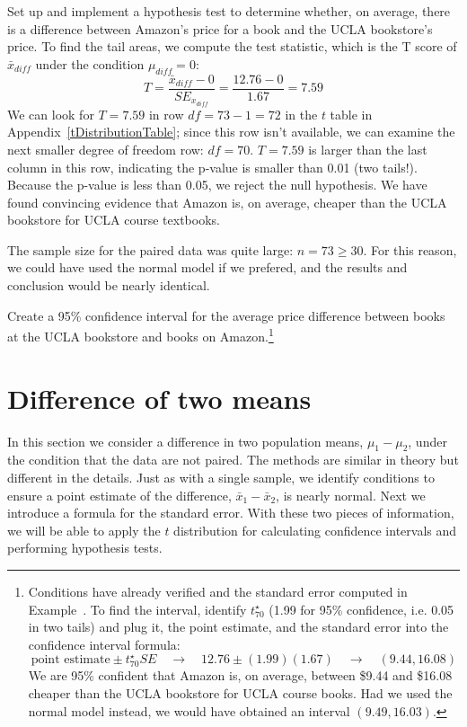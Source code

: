 \begin{example}{Set up and implement a hypothesis test to determine whether, on average, there is a difference between Amazon's price for a book and the UCLA bookstore's price.}
To find the tail areas, we compute the test statistic, which is the T score of $\bar{x}_{diff}$ under the condition $\mu_{diff} = 0$:
$$T = \frac{\bar{x}_{diff} - 0}{SE_{x_{diff}}} = \frac{12.76 - 0}{1.67} = 7.59$$
We can look for $T=7.59$ in row $df=73-1=72$ in the $t$ table in Appendix~\vref{tDistributionTable}; since this row isn't available, we can examine the next smaller degree of freedom row: $df=70$. $T=7.59$ is larger than the last column in this row, indicating the p-value is smaller than 0.01 (two tails!).
Because the p-value is less than 0.05, we reject the null hypothesis. We have found convincing evidence that Amazon is, on average, cheaper than the UCLA bookstore for UCLA course textbooks.
\end{example}

The sample size for the paired data was quite large: $n = 73 \geq 30$. For this reason, we could have used the normal model if we prefered, and the results and conclusion would be nearly identical.

\begin{exercise}
Create a 95\% confidence interval for the average price difference between books at the UCLA bookstore and books on Amazon.\footnote{Conditions have already verified and the standard error computed in Example~. To find the interval, identify $t^{\star}_{70}$ (1.99 for 95\% confidence, i.e. 0.05 in two tails) and plug it, the point estimate, and the standard error into the confidence interval formula:
$$\text{point estimate} \pm t_{70}^{\star}SE \quad\to\quad 12.76 \pm (1.99)(1.67) \quad\to\quad (9.44, 16.08)$$
We are 95\% confident that Amazon is, on average, between \$9.44 and \$16.08 cheaper than the UCLA bookstore for UCLA course books. Had we used the normal model instead, we would have obtained an interval $(9.49, 16.03)$.}
\end{exercise}

\section{Difference of two means}
\label{differenceOfTwoMeans}

In this section we consider a difference in two population means, $\mu_1 - \mu_2$, under the condition that the data are not paired. The methods are similar in theory but different in the details. Just as with a single sample, we identify conditions to ensure a point estimate of the difference, $\bar{x}_1 - \bar{x}_2$, is nearly normal. Next we introduce a formula for the standard error. With these two pieces of information, we will be able to apply the $t$ distribution for calculating confidence intervals and performing hypothesis tests.

